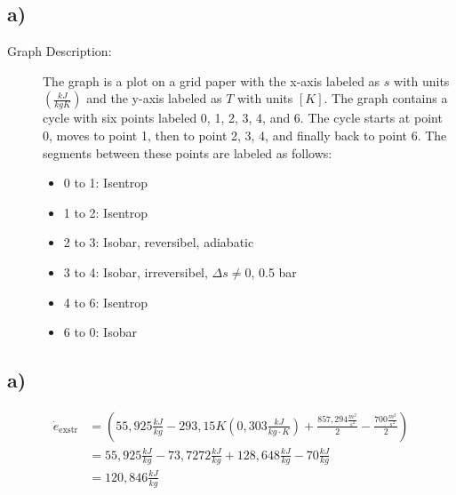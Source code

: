

\subsection*{a)}

\begin{description}
    \item[Graph Description:] The graph is a plot on a grid paper with the x-axis labeled as $s$ with units $\left(\frac{kJ}{kgK}\right)$ and the y-axis labeled as $T$ with units $[K]$. The graph contains a cycle with six points labeled 0, 1, 2, 3, 4, and 6. The cycle starts at point 0, moves to point 1, then to point 2, 3, 4, and finally back to point 6. The segments between these points are labeled as follows:
    \begin{itemize}
        \item 0 to 1: Isentrop
        \item 1 to 2: Isentrop
        \item 2 to 3: Isobar, reversibel, adiabatic
        \item 3 to 4: Isobar, irreversibel, $\Delta s \neq 0$, 0.5 bar
        \item 4 to 6: Isentrop
        \item 6 to 0: Isobar
    \end{itemize}
\end{description}



\subsection*{a)}
\begin{align*}
\dot{e}_{\text{exstr}} &= \left( 55,925 \frac{kJ}{kg} - 293,15 K \left( 0,303 \frac{kJ}{kg \cdot K} \right) + \frac{857,294 \frac{m^2}{s^2}}{2} - \frac{700 \frac{m^2}{s^2}}{2} \right) \\
&= 55,925 \frac{kJ}{kg} - 73,7272 \frac{kJ}{kg} + 128,648 \frac{kJ}{kg} - 70 \frac{kJ}{kg} \\
&= 120,846 \frac{kJ}{kg}
\end{align*}